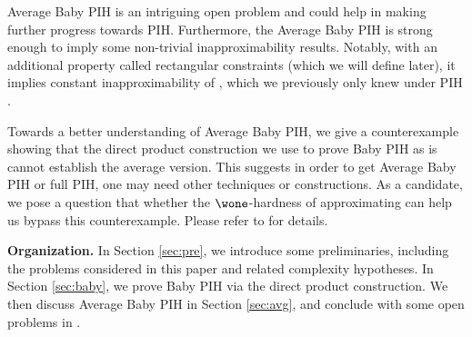 Average Baby PIH is an intriguing open problem and could help in making further progress towards PIH. Furthermore, the Average Baby PIH is strong enough to imply some non-trivial inapproximability results. 
Notably, with an additional property called rectangular constraints (which we will define later), it implies constant inapproximability of \kexact{}, which we previously only knew under PIH \cite{Man20}. 

Towards a better understanding of Average Baby PIH, we give a counterexample showing that the direct product construction we use to prove Baby PIH as is cannot establish the average version. This suggests in order to get Average Baby PIH or full PIH, one may need other techniques or constructions. As a candidate, we pose a question that whether the $\wone$-hardness of approximating \kclique{} can help us bypass this counterexample. Please refer to  for details. 

\medskip \noindent \textbf{Organization.}
In Section \ref{sec:pre}, we introduce some preliminaries, including the problems considered in this paper and related complexity hypotheses. In Section \ref{sec:baby}, we prove Baby PIH via the direct product construction. We then discuss Average Baby PIH in Section \ref{sec:avg}, and conclude with some open problems in .

